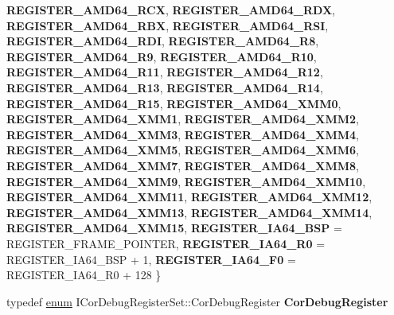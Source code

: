 \begin{DoxyCompactItemize}
{\bfseries R\+E\+G\+I\+S\+T\+E\+R\+\_\+\+A\+M\+D64\+\_\+\+R\+CX}, 
{\bfseries R\+E\+G\+I\+S\+T\+E\+R\+\_\+\+A\+M\+D64\+\_\+\+R\+DX}, 
{\bfseries R\+E\+G\+I\+S\+T\+E\+R\+\_\+\+A\+M\+D64\+\_\+\+R\+BX}, 
{\bfseries R\+E\+G\+I\+S\+T\+E\+R\+\_\+\+A\+M\+D64\+\_\+\+R\+SI}, 
\newline
{\bfseries R\+E\+G\+I\+S\+T\+E\+R\+\_\+\+A\+M\+D64\+\_\+\+R\+DI}, 
{\bfseries R\+E\+G\+I\+S\+T\+E\+R\+\_\+\+A\+M\+D64\+\_\+\+R8}, 
{\bfseries R\+E\+G\+I\+S\+T\+E\+R\+\_\+\+A\+M\+D64\+\_\+\+R9}, 
{\bfseries R\+E\+G\+I\+S\+T\+E\+R\+\_\+\+A\+M\+D64\+\_\+\+R10}, 
\newline
{\bfseries R\+E\+G\+I\+S\+T\+E\+R\+\_\+\+A\+M\+D64\+\_\+\+R11}, 
{\bfseries R\+E\+G\+I\+S\+T\+E\+R\+\_\+\+A\+M\+D64\+\_\+\+R12}, 
{\bfseries R\+E\+G\+I\+S\+T\+E\+R\+\_\+\+A\+M\+D64\+\_\+\+R13}, 
{\bfseries R\+E\+G\+I\+S\+T\+E\+R\+\_\+\+A\+M\+D64\+\_\+\+R14}, 
\newline
{\bfseries R\+E\+G\+I\+S\+T\+E\+R\+\_\+\+A\+M\+D64\+\_\+\+R15}, 
{\bfseries R\+E\+G\+I\+S\+T\+E\+R\+\_\+\+A\+M\+D64\+\_\+\+X\+M\+M0}, 
{\bfseries R\+E\+G\+I\+S\+T\+E\+R\+\_\+\+A\+M\+D64\+\_\+\+X\+M\+M1}, 
{\bfseries R\+E\+G\+I\+S\+T\+E\+R\+\_\+\+A\+M\+D64\+\_\+\+X\+M\+M2}, 
\newline
{\bfseries R\+E\+G\+I\+S\+T\+E\+R\+\_\+\+A\+M\+D64\+\_\+\+X\+M\+M3}, 
{\bfseries R\+E\+G\+I\+S\+T\+E\+R\+\_\+\+A\+M\+D64\+\_\+\+X\+M\+M4}, 
{\bfseries R\+E\+G\+I\+S\+T\+E\+R\+\_\+\+A\+M\+D64\+\_\+\+X\+M\+M5}, 
{\bfseries R\+E\+G\+I\+S\+T\+E\+R\+\_\+\+A\+M\+D64\+\_\+\+X\+M\+M6}, 
\newline
{\bfseries R\+E\+G\+I\+S\+T\+E\+R\+\_\+\+A\+M\+D64\+\_\+\+X\+M\+M7}, 
{\bfseries R\+E\+G\+I\+S\+T\+E\+R\+\_\+\+A\+M\+D64\+\_\+\+X\+M\+M8}, 
{\bfseries R\+E\+G\+I\+S\+T\+E\+R\+\_\+\+A\+M\+D64\+\_\+\+X\+M\+M9}, 
{\bfseries R\+E\+G\+I\+S\+T\+E\+R\+\_\+\+A\+M\+D64\+\_\+\+X\+M\+M10}, 
\newline
{\bfseries R\+E\+G\+I\+S\+T\+E\+R\+\_\+\+A\+M\+D64\+\_\+\+X\+M\+M11}, 
{\bfseries R\+E\+G\+I\+S\+T\+E\+R\+\_\+\+A\+M\+D64\+\_\+\+X\+M\+M12}, 
{\bfseries R\+E\+G\+I\+S\+T\+E\+R\+\_\+\+A\+M\+D64\+\_\+\+X\+M\+M13}, 
{\bfseries R\+E\+G\+I\+S\+T\+E\+R\+\_\+\+A\+M\+D64\+\_\+\+X\+M\+M14}, 
\newline
{\bfseries R\+E\+G\+I\+S\+T\+E\+R\+\_\+\+A\+M\+D64\+\_\+\+X\+M\+M15}, 
{\bfseries R\+E\+G\+I\+S\+T\+E\+R\+\_\+\+I\+A64\+\_\+\+B\+SP} = R\+E\+G\+I\+S\+T\+E\+R\+\_\+\+F\+R\+A\+M\+E\+\_\+\+P\+O\+I\+N\+T\+ER, 
{\bfseries R\+E\+G\+I\+S\+T\+E\+R\+\_\+\+I\+A64\+\_\+\+R0} = R\+E\+G\+I\+S\+T\+E\+R\+\_\+\+I\+A64\+\_\+\+B\+SP + 1, 
{\bfseries R\+E\+G\+I\+S\+T\+E\+R\+\_\+\+I\+A64\+\_\+\+F0} = R\+E\+G\+I\+S\+T\+E\+R\+\_\+\+I\+A64\+\_\+\+R0 + 128
 \}
\item 
\mbox{\label{interface_i_cor_debug_register_set_ac99e0d70dbc48f27ba5e7eb89b8973fd}} 
typedef \hyperlink{interfaceenum}{enum} I\+Cor\+Debug\+Register\+Set\+::\+Cor\+Debug\+Register {\bfseries Cor\+Debug\+Register}
\end{DoxyCompactItemize}
